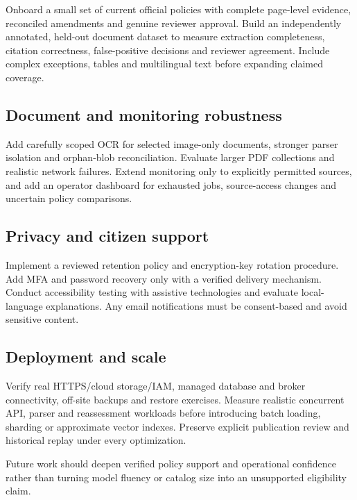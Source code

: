 \documentclass[12pt,a4paper,twoside]{report}
\begin{document}
Onboard a small set of current official policies with complete page-level evidence, reconciled amendments and genuine reviewer approval. Build an independently annotated, held-out document dataset to measure extraction completeness, citation correctness, false-positive decisions and reviewer agreement. Include complex exceptions, tables and multilingual text before expanding claimed coverage.

\subsection*{Document and monitoring robustness}

Add carefully scoped OCR for selected image-only documents, stronger parser isolation and orphan-blob reconciliation. Evaluate larger PDF collections and realistic network failures. Extend monitoring only to explicitly permitted sources, and add an operator dashboard for exhausted jobs, source-access changes and uncertain policy comparisons.

\subsection*{Privacy and citizen support}

Implement a reviewed retention policy and encryption-key rotation procedure. Add MFA and password recovery only with a verified delivery mechanism. Conduct accessibility testing with assistive technologies and evaluate local-language explanations. Any email notifications must be consent-based and avoid sensitive content.

\subsection*{Deployment and scale}

Verify real HTTPS/cloud storage/IAM, managed database and broker connectivity, off-site backups and restore exercises. Measure realistic concurrent API, parser and reassessment workloads before introducing batch loading, sharding or approximate vector indexes. Preserve explicit publication review and historical replay under every optimization.

Future work should deepen verified policy support and operational confidence rather than turning model fluency or catalog size into an unsupported eligibility claim.
\end{document}
